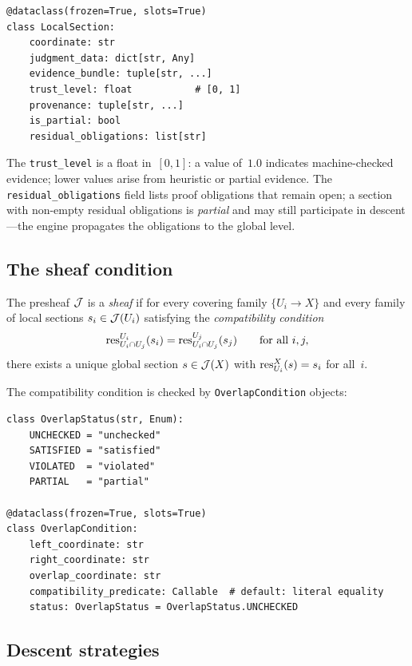 \documentclass[11pt]{article}
\begin{document}
\begin{lstlisting}[caption={Local section representation.},label={lst:local-section}]
@dataclass(frozen=True, slots=True)
class LocalSection:
    coordinate: str
    judgment_data: dict[str, Any]
    evidence_bundle: tuple[str, ...]
    trust_level: float           # [0, 1]
    provenance: tuple[str, ...]
    is_partial: bool
    residual_obligations: list[str]
\end{lstlisting}

The \texttt{trust\_level} is a float in~$[0,1]$: a value of~$1.0$ indicates
machine-checked evidence; lower values arise from heuristic or partial
evidence.  The \texttt{residual\_obligations} field lists proof obligations
that remain open; a section with non-empty residual obligations is
\emph{partial} and may still participate in descent---the engine propagates
the obligations to the global level.

\subsection{The sheaf condition}

\begin{definition}\label{def:sheaf}
The presheaf $\mathcal{J}$ is a \emph{sheaf} if for every covering family
$\{U_i \to X\}$ and every family of local sections
$s_i \in \mathcal{J}(U_i)$ satisfying the \emph{compatibility condition}
\[
  \mathrm{res}^{U_i}_{U_i \cap U_j}(s_i) = \mathrm{res}^{U_j}_{U_i \cap U_j}(s_j)
  \qquad \text{for all } i, j,
\]
there exists a unique global section $s \in \mathcal{J}(X)$ with
$\mathrm{res}^X_{U_i}(s) = s_i$ for all~$i$.
\end{definition}

The compatibility condition is checked by \texttt{OverlapCondition} objects:

\begin{lstlisting}[caption={Overlap condition and status.},label={lst:overlap}]
class OverlapStatus(str, Enum):
    UNCHECKED = "unchecked"
    SATISFIED = "satisfied"
    VIOLATED  = "violated"
    PARTIAL   = "partial"

@dataclass(frozen=True, slots=True)
class OverlapCondition:
    left_coordinate: str
    right_coordinate: str
    overlap_coordinate: str
    compatibility_predicate: Callable  # default: literal equality
    status: OverlapStatus = OverlapStatus.UNCHECKED
\end{lstlisting}

\subsection{Descent strategies}
\end{document}
